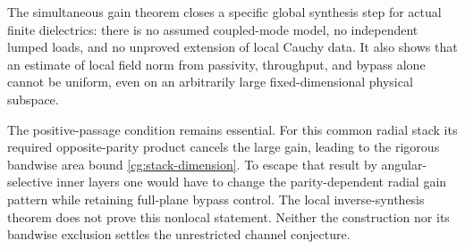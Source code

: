 \begin{remark}
\label{cg:scope}
The simultaneous gain theorem closes a specific global synthesis step
for actual finite dielectrics: there is no assumed coupled-mode model,
no independent lumped loads, and no unproved extension of local Cauchy
data.  It also shows that an estimate of local field norm from
passivity, throughput, and bypass alone cannot be uniform, even on an
arbitrarily large fixed-dimensional physical subspace.

The positive-passage condition remains essential.  For this common
radial stack its required opposite-parity product cancels the large
gain, leading to the rigorous bandwise area bound
\eqref{cg:stack-dimension}.  To escape that result by angular-selective
inner layers one would have to change the parity-dependent radial
gain pattern while retaining full-plane bypass control.  The local
inverse-synthesis theorem does not prove this nonlocal statement.
Neither the construction nor its bandwise exclusion settles the
unrestricted channel conjecture.
\end{remark}
